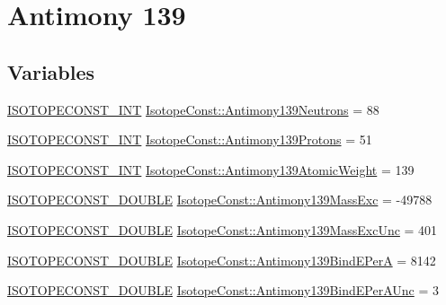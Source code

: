 \hypertarget{group___isotope_const-_antimony-_sb139}{}\section{Antimony 139}
\label{group___isotope_const-_antimony-_sb139}
\subsection*{Variables}
\begin{DoxyCompactItemize}
\item 
\mbox{\hyperlink{group___isotope_const-_macros_ga5f18360b3e99483a35c32d789e62621c}{I\+S\+O\+T\+O\+P\+E\+C\+O\+N\+S\+T\+\_\+\+I\+NT}} \mbox{\hyperlink{group___isotope_const-_antimony-_sb139_gab56b7d326cbc484b24e72d33b318b416}{Isotope\+Const\+::\+Antimony139\+Neutrons}} = 88
\item 
\mbox{\hyperlink{group___isotope_const-_macros_ga5f18360b3e99483a35c32d789e62621c}{I\+S\+O\+T\+O\+P\+E\+C\+O\+N\+S\+T\+\_\+\+I\+NT}} \mbox{\hyperlink{group___isotope_const-_antimony-_sb139_ga1f7d88f4d6407ed5f3d3c3c70a59c4cc}{Isotope\+Const\+::\+Antimony139\+Protons}} = 51
\item 
\mbox{\hyperlink{group___isotope_const-_macros_ga5f18360b3e99483a35c32d789e62621c}{I\+S\+O\+T\+O\+P\+E\+C\+O\+N\+S\+T\+\_\+\+I\+NT}} \mbox{\hyperlink{group___isotope_const-_antimony-_sb139_gaa67023b4d20280556caaff5c57d2aa7b}{Isotope\+Const\+::\+Antimony139\+Atomic\+Weight}} = 139
\item 
\mbox{\hyperlink{group___isotope_const-_macros_ga8f45a7272ce02c0b4c65c44636ed719a}{I\+S\+O\+T\+O\+P\+E\+C\+O\+N\+S\+T\+\_\+\+D\+O\+U\+B\+LE}} \mbox{\hyperlink{group___isotope_const-_antimony-_sb139_ga00c49517a9ecb87e27e5c1419b45150e}{Isotope\+Const\+::\+Antimony139\+Mass\+Exc}} = -\/49788
\item 
\mbox{\hyperlink{group___isotope_const-_macros_ga8f45a7272ce02c0b4c65c44636ed719a}{I\+S\+O\+T\+O\+P\+E\+C\+O\+N\+S\+T\+\_\+\+D\+O\+U\+B\+LE}} \mbox{\hyperlink{group___isotope_const-_antimony-_sb139_gae28c3b2c3f0a7f8a5e2cc591e5a43d80}{Isotope\+Const\+::\+Antimony139\+Mass\+Exc\+Unc}} = 401
\item 
\mbox{\hyperlink{group___isotope_const-_macros_ga8f45a7272ce02c0b4c65c44636ed719a}{I\+S\+O\+T\+O\+P\+E\+C\+O\+N\+S\+T\+\_\+\+D\+O\+U\+B\+LE}} \mbox{\hyperlink{group___isotope_const-_antimony-_sb139_ga38c838d33ee0fa7eb6372e61491327b6}{Isotope\+Const\+::\+Antimony139\+Bind\+E\+PerA}} = 8142
\item 
\mbox{\hyperlink{group___isotope_const-_macros_ga8f45a7272ce02c0b4c65c44636ed719a}{I\+S\+O\+T\+O\+P\+E\+C\+O\+N\+S\+T\+\_\+\+D\+O\+U\+B\+LE}} \mbox{\hyperlink{group___isotope_const-_antimony-_sb139_ga816e82a6d14dd51cb627740127117949}{Isotope\+Const\+::\+Antimony139\+Bind\+E\+Per\+A\+Unc}} = 3

\end{DoxyCompactItemize}
